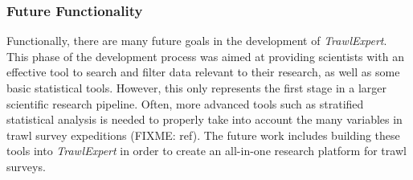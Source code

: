 \documentclass{article}
\begin{document}
\subsubsection{Future Functionality}
Functionally, there are many future goals in the development of \textit{TrawlExpert}. This phase of the development process was aimed at providing scientists with an effective tool to search and filter data relevant to their research, as well as some basic statistical tools. However, this only represents the first stage in a larger scientific research pipeline. Often, more advanced tools such as stratified statistical analysis is needed to properly take into account the many variables in trawl survey expeditions (FIXME: ref). The future work includes building these tools into \textit{TrawlExpert} in order to create an all-in-one research platform for trawl surveys.

\clearpage


\end{document}
